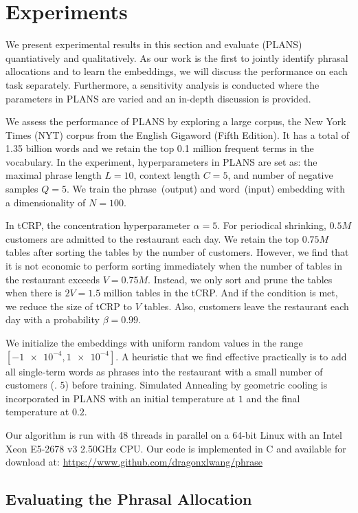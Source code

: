 \section{Experiments}

We present  experimental results in this section and evaluate
\PLANS{} (PLANS)  quantiatively and qualitatively. As our work is the
first to jointly identify phrasal allocations and to learn the embeddings, we
will discuss the performance on each task separately. Furthermore, a
sensitivity analysis is conducted where the parameters in PLANS are varied and
an in-depth discussion is provided.

We assess the performance of PLANS by exploring a large corpus, the New York
Times (NYT) corpus from the English Gigaword (Fifth Edition). It has a total of
1.35 billion words and we retain the top 0.1 million frequent terms in the
vocabulary. In the experiment, hyperparameters in PLANS are set as: the maximal
phrase length $L = 10$, context length $C = 5$, and number of negative samples
$Q = 5$. We train the phrase~(output) and word~(input) embedding with a
dimensionality of $N = 100$.

In tCRP, the concentration hyperparameter $\alpha = 5$. For periodical shrinking,
$0.5M$ customers are admitted to the restaurant each day. We retain the top
$0.75M$ tables after sorting the tables by the number of customers. However, we
find that it is not economic to perform sorting immediately when the number of
tables in the restaurant exceeds $V = 0.75M$.  Instead, we only sort and prune
the tables when there is $2V = 1.5$ million tables in the tCRP. And if the
condition is met, we reduce the size of tCRP to $V$ tables. Also, customers
leave the restaurant each day with a probability $\beta = 0.99$.

We initialize the embeddings with uniform random values in the range
$[\SI{-1e-4}, \SI{1e-4}]$. A heuristic that we find effective practically is to
add all single-term words as phrases into the restaurant with a small number of
customers (\eg. $5$) before training. Simulated Annealing by geometric cooling
is incorporated in PLANS with an initial temperature at $1$ and the final
temperature at $0.2$.

Our algorithm is run with 48 threads in parallel on a 64-bit Linux with an Intel
Xeon E5-2678 v3 2.50GHz CPU. Our code is implemented in C and available for
download at: \url{https://www.github.com/dragonxlwang/phrase}

\subsection{Evaluating the Phrasal Allocation}

